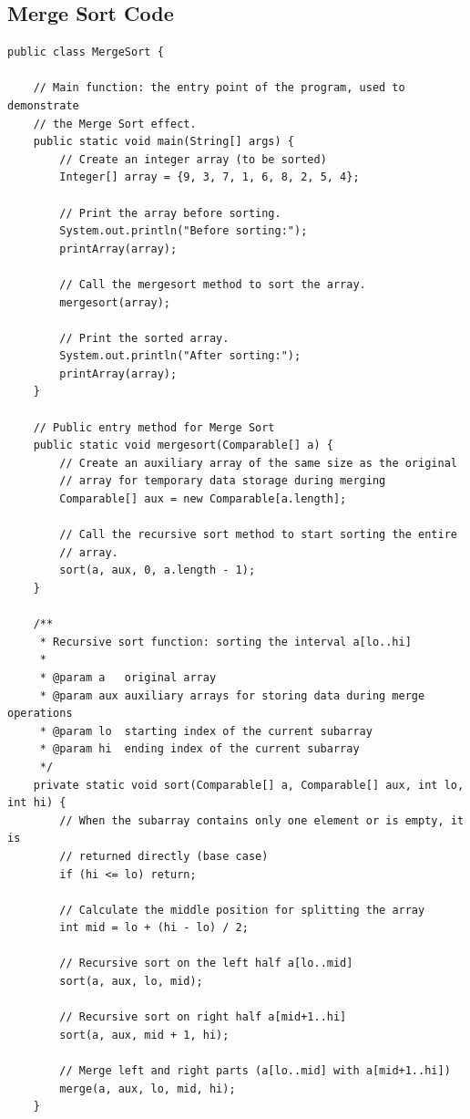 \documentclass[letterpaper,12pt]{article}
\begin{document}
\subsection{Merge Sort Code}
\begin{verbatim}
public class MergeSort {

    // Main function: the entry point of the program, used to demonstrate
    // the Merge Sort effect.
    public static void main(String[] args) {
        // Create an integer array (to be sorted)
        Integer[] array = {9, 3, 7, 1, 6, 8, 2, 5, 4};

        // Print the array before sorting.
        System.out.println("Before sorting:");
        printArray(array);

        // Call the mergesort method to sort the array.
        mergesort(array);

        // Print the sorted array.
        System.out.println("After sorting:");
        printArray(array);
    }

    // Public entry method for Merge Sort
    public static void mergesort(Comparable[] a) {
        // Create an auxiliary array of the same size as the original
        // array for temporary data storage during merging
        Comparable[] aux = new Comparable[a.length];

        // Call the recursive sort method to start sorting the entire
        // array.
        sort(a, aux, 0, a.length - 1);
    }

    /**
     * Recursive sort function: sorting the interval a[lo..hi]
     *
     * @param a   original array
     * @param aux auxiliary arrays for storing data during merge operations
     * @param lo  starting index of the current subarray
     * @param hi  ending index of the current subarray
     */
    private static void sort(Comparable[] a, Comparable[] aux, int lo, int hi) {
        // When the subarray contains only one element or is empty, it is
        // returned directly (base case)
        if (hi <= lo) return;

        // Calculate the middle position for splitting the array
        int mid = lo + (hi - lo) / 2;

        // Recursive sort on the left half a[lo..mid]
        sort(a, aux, lo, mid);

        // Recursive sort on right half a[mid+1..hi]
        sort(a, aux, mid + 1, hi);

        // Merge left and right parts (a[lo..mid] with a[mid+1..hi])
        merge(a, aux, lo, mid, hi);
    }


\end{verbatim}
\end{document}
